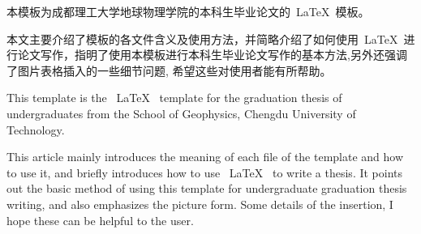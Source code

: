 \begin{cnabstract}
本模板为成都理工大学地球物理学院的本科生毕业论文的~\LaTeX~模板。

本文主要介绍了模板的各文件含义及使用方法，并简略介绍了如何使用~\LaTeX~进行论文写作，指明了使用本模板进行本科生毕业论文写作的基本方法,另外还强调了图片表格插入的一些细节问题, 希望这些对使用者能有所帮助。
\end{cnabstract}
\vspace{1em}\par


\begin{enabstract}
This template is the ~\LaTeX~ template for the graduation thesis of undergraduates from the School of Geophysics, Chengdu University of Technology.

This article mainly introduces the meaning of each file of the template and how to use it, and briefly introduces how to use ~\LaTeX~ to write a thesis. It points out the basic method of using this template for undergraduate graduation thesis writing, and also emphasizes the picture form. Some details of the insertion, I hope these can be helpful to the user.
\end{enabstract}
\vspace{1em}\par



